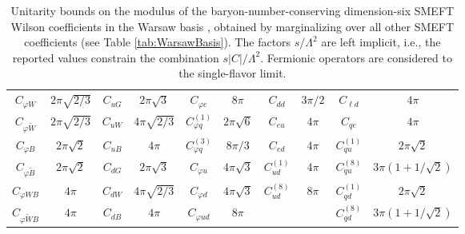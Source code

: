 \documentclass[a4paper,11pt]{article}
\begin{document}
\begin{table}[h!t!b]
{\begin{tabular}{c|c|c|c|c|c|c|c|c|c}
         $C_{\varphi W}$ & $2\pi\sqrt{2/3}$ & $C_{uG}$ & $2\pi\sqrt{3}$ & $C_{\varphi e}$ & $8\pi$ & $C_{dd}$ & $3\pi/2$ & $C_{\ell d}$ & $4\pi$\\
         
         $C_{\varphi \widetilde W}$ & $2\pi\sqrt{2/3}$ & $C_{uW}$ & $4\pi\sqrt{2/3}$ & $C_{\varphi q}^{(1)}$ & $2\pi\sqrt{6}$ & $C_{eu}$ & $4\pi$ & $C_{q e}$ & $4\pi$ \\
         
        $C_{\varphi B}$ & $2\pi\sqrt{2}$ & $C_{uB}$ & $4\pi$ & $C_{\varphi q}^{(3)}$ & $8\pi/3$ & $C_{ed}$ & $4\pi$ & $C_{q u}^{(1)}$ & $2\pi\sqrt{2}$\\
        
        $C_{\varphi \widetilde B}$ & $2\pi\sqrt{2}$ & $C_{dG}$ & $2\pi\sqrt{3}$ & $C_{\varphi u}$ & $4\pi \sqrt{3}$ & $C_{ud}^{(1)}$ & $4\pi$ & $C_{q u}^{(8)}$ & $3\pi(1+1/\sqrt{2})$\\
        
        $C_{\varphi W B}$ & $4\pi$ & $C_{dW}$ & $4\pi\sqrt{2/3}$ & $C_{\varphi d}$ & $4\pi\sqrt{3}$ & $C_{ud}^{(8)}$ & $8\pi$ & $C_{qd}^{(1)}$ & $2\pi\sqrt{2}$\\
        
        $C_{\varphi \widetilde W B}$ & $4\pi$ & $C_{dB}$ & $4\pi$ & $C_{\varphi ud}$ & $8\pi$ & & & $C_{q d}^{(8)}$ & $3\pi(1+1/\sqrt{2})$ \\
        \bottomrule
    \end{tabular}
    }
    \caption{Unitarity bounds on the modulus of the baryon-number-conserving dimension-six SMEFT Wilson coefficients in the Warsaw basis \cite{Grzadkowski:2010es}, obtained by marginalizing over all other SMEFT coefficients (see Table \ref{tab:WarsawBasis}). The factors $s/\Lambda^2$ are left implicit, i.e., the reported values constrain the combination $s|C|/\Lambda^2$. Fermionic operators are considered to the single-flavor limit.}
    \label{tab:UniBounds}
\end{table}
\end{document}
